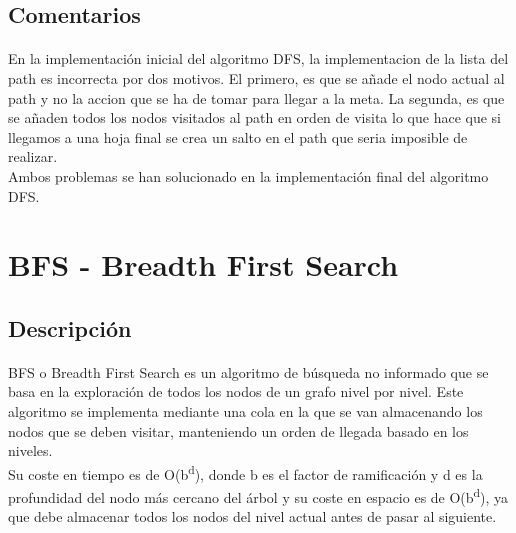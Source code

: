 \documentclass{report}
\begin{document}
        \subsection*{Comentarios}
          \paragraph*{}{
            En la implementación inicial del algoritmo DFS, la implementacion de la lista del path es incorrecta por dos motivos. 
            El primero, es que se añade el nodo actual al path y no la accion que se ha de tomar para llegar a la meta.
            La segunda, es que se añaden todos los nodos visitados al path en orden de visita lo que hace que si llegamos a una hoja final se crea un salto en el path que seria imposible de realizar.\\
            Ambos problemas se han solucionado en la implementación final del algoritmo DFS.\\
          }
      \clearpage\section{BFS - Breadth First Search}
        \subsection*{Descripción}
          \paragraph*{}{
            BFS o Breadth First Search es un algoritmo de búsqueda no informado que se basa en la exploración de todos los nodos de un grafo nivel por nivel. Este algoritmo se implementa mediante una cola en la que se van almacenando los nodos que se deben visitar, manteniendo un orden de llegada basado en los niveles.\\ 
            Su coste en tiempo es de O(b\textsuperscript{d}), donde b es el factor de ramificación y d es la profundidad del nodo más cercano del árbol y su coste en espacio es de O(b\textsuperscript{d}), ya que debe almacenar todos los nodos del nivel actual antes de pasar al siguiente.\\
          }
\end{document}
